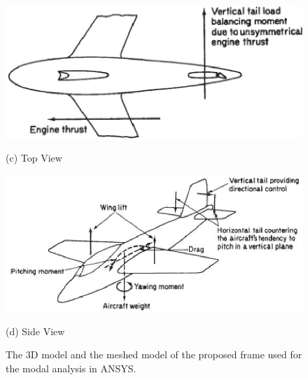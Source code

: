 \begin{figure}
\begin{minipage}{0.4\textwidth}
\end{minipage}
%
\vspace{0.1in}
\begin{minipage}{0.5\textwidth}
\begin{centering}
\includegraphics[width=\textwidth]{figures/top_view.eps}
\centerline{\small (c) Top View}
\end{centering}
\end{minipage}
\hspace{2mm}
\begin{minipage}{0.4\textwidth}
\begin{centering}
\includegraphics[width=\textwidth]{figures/3D.eps}
\centerline{\small (d) Side View}
\end{centering}
\end{minipage}
\caption{The 3D model and the meshed model of the proposed frame used for the modal analysis in ANSYS.}
\label{fig:3view}
\end{figure}
%
%
